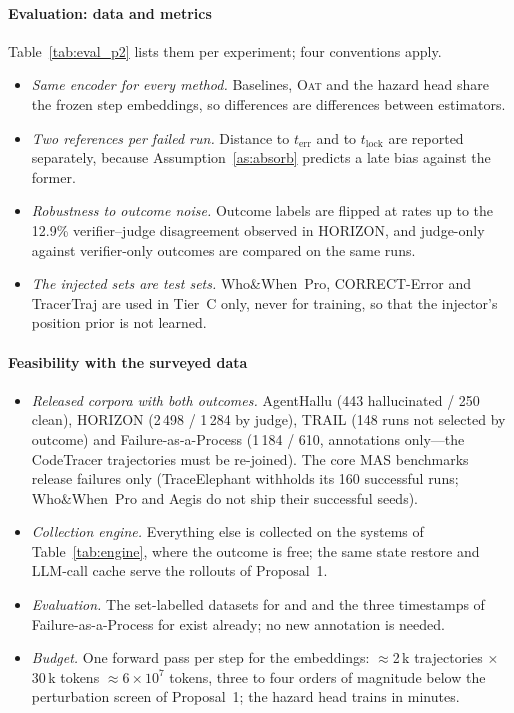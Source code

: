 \paragraph{Evaluation: data and metrics} Table~\ref{tab:eval_p2} lists them per experiment; four conventions apply.
\begin{itemize}[leftmargin=1.1em]
\item \emph{Same encoder for every method.} Baselines, \textsc{Oat} and the hazard head share the frozen step embeddings, so differences are differences between estimators.
\item \emph{Two references per failed run.} Distance to $t_{\mathrm{err}}$ and to $t_{\mathrm{lock}}$ are reported separately, because Assumption~\ref{as:absorb} predicts a late bias against the former.
\item \emph{Robustness to outcome noise.} Outcome labels are flipped at rates up to the 12.9\% verifier--judge disagreement observed in HORIZON, and judge-only against verifier-only outcomes are compared on the same runs.
\item \emph{The injected sets are test sets.} Who\&When~Pro, CORRECT-Error and TracerTraj are used in Tier~C only, never for training, so that the injector's position prior is not learned.
\end{itemize}

\paragraph{Feasibility with the surveyed data}
\begin{itemize}[leftmargin=1.1em]
\item \emph{Released corpora with both outcomes.} AgentHallu (443 hallucinated / 250 clean), HORIZON (2\,498 / 1\,284 by judge), TRAIL (148 runs not selected by outcome) and Failure-as-a-Process (1\,184 / 610, annotations only---the CodeTracer trajectories must be re-joined). The core MAS benchmarks release failures only (TraceElephant withholds its 160 successful runs; Who\&When~Pro and Aegis do not ship their successful seeds).
\item \emph{Collection engine.} Everything else is collected on the systems of Table~\ref{tab:engine}, where the outcome is free; the same state restore and LLM-call cache serve the rollouts of Proposal~1.
\item \emph{Evaluation.} The set-labelled datasets for  and  and the three timestamps of Failure-as-a-Process for  exist already; no new annotation is needed.
\item \emph{Budget.} One forward pass per step for the embeddings: $\approx$2\,k trajectories $\times$ 30\,k tokens $\approx6\times10^{7}$ tokens, three to four orders of magnitude below the perturbation screen of Proposal~1; the hazard head trains in minutes.
\end{itemize}

